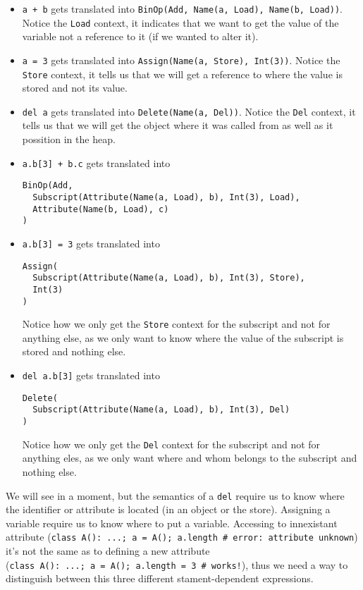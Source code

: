 \begin{itemize}
\item
  \texttt{a\ +\ b} gets translated into
  \texttt{BinOp(Add,\ Name(a,\ Load),\ Name(b,\ Load))}. Notice the
  \texttt{Load} context, it indicates that we want to get the value of
  the variable not a reference to it (if we wanted to alter it).
\item
  \texttt{a\ =\ 3} gets translated into
  \texttt{Assign(Name(a,\ Store),\ Int(3))}. Notice the \texttt{Store}
  context, it tells us that we will get a reference to where the value
  is stored and not its value.
\item
  \texttt{del\ a} gets translated into \texttt{Delete(Name(a,\ Del))}.
  Notice the \texttt{Del} context, it tells us that we will get the
  object where it was called from as well as it possition in the heap.
\item
  \texttt{a.b{[}3{]}\ +\ b.c} gets translated into

\begin{verbatim}
BinOp(Add,
  Subscript(Attribute(Name(a, Load), b), Int(3), Load),
  Attribute(Name(b, Load), c)
)
\end{verbatim}
\item
  \texttt{a.b{[}3{]}\ =\ 3} gets translated into

\begin{verbatim}
Assign(
  Subscript(Attribute(Name(a, Load), b), Int(3), Store),
  Int(3)
)
\end{verbatim}

  Notice how we only get the \texttt{Store} context for the subscript
  and not for anything else, as we only want to know where the value of
  the subscript is stored and nothing else.
\item
  \texttt{del\ a.b{[}3{]}} gets translated into

\begin{verbatim}
Delete(
  Subscript(Attribute(Name(a, Load), b), Int(3), Del)
)
\end{verbatim}

  Notice how we only get the \texttt{Del} context for the subscript and
  not for anything eles, as we only want where and whom belongs to the
  subscript and nothing else.
\end{itemize}

We will see in a moment, but the semantics of a \texttt{del} require us
to know where the identifier or attribute is located (in an object or
the store). Assigning a variable require us to know where to put a
variable. Accessing to innexistant attribute
(\texttt{class\ A():\ ...;\ a\ =\ A();\ a.length\ \#\ error:\ attribute\ unknown})
it's not the same as to defining a new attribute
(\texttt{class\ A():\ ...;\ a\ =\ A();\ a.length\ =\ 3\ \#\ works!}),
thus we need a way to distinguish between this three different
stament-dependent expressions.

